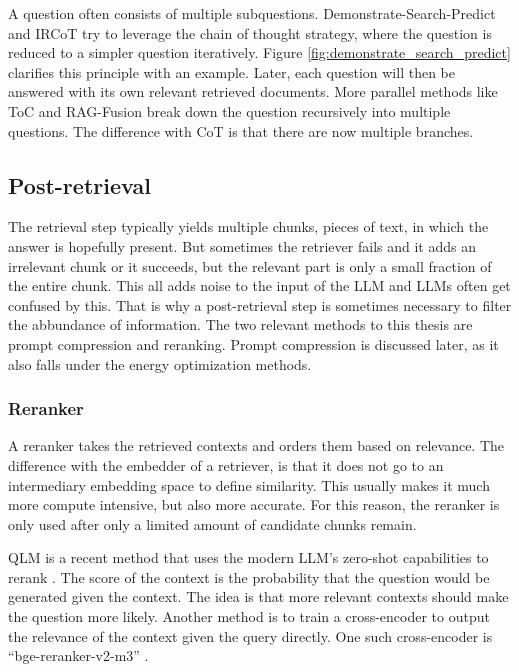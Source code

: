 A question often consists of multiple subquestions. Demonstrate-Search-Predict \cite{khattab2022demonstrate} and IRCoT \cite{trivedi2022interleaving} try to leverage the chain of thought strategy, where the question is reduced to a simpler question iteratively. Figure \ref{fig:demonstrate_search_predict} clarifies this principle with an example. Later, each question will then be answered with its own relevant retrieved documents. More parallel methods like ToC \cite{kim2023tree} and RAG-Fusion \cite{rackauckas2024ragfusion} break down the question recursively into multiple questions. The difference with CoT is that there are now multiple branches.

\subsection{Post-retrieval}
The retrieval step typically yields multiple chunks, pieces of text, in which the answer is hopefully present. But sometimes the retriever fails and it adds an irrelevant chunk or it succeeds, but the relevant part is only a small fraction of the entire chunk. This all adds noise to the input of the LLM and LLMs often get confused by this. That is why a post-retrieval step is sometimes necessary to filter the abbundance of information. The two relevant methods to this thesis are prompt compression and reranking. Prompt compression is discussed later, as it also falls under the energy optimization methods.

\subsubsection{Reranker}
A reranker takes the retrieved contexts and orders them based on relevance. The difference with the embedder of a retriever, is that it does not go to an intermediary embedding space to define similarity. This usually makes it much more compute intensive, but also more accurate. For this reason, the reranker is only used after only a limited amount of candidate chunks remain.

QLM is a recent method that uses the modern LLM's zero-shot capabilities to rerank \cite{zhuang2023qlm}. The score of the context is the probability that the question would be generated given the context. The idea is that more relevant contexts should make the question more likely. Another method is to train a cross-encoder to output the relevance of the context given the query directly. One such cross-encoder is ``bge-reranker-v2-m3'' \cite{chen2024bge}.

